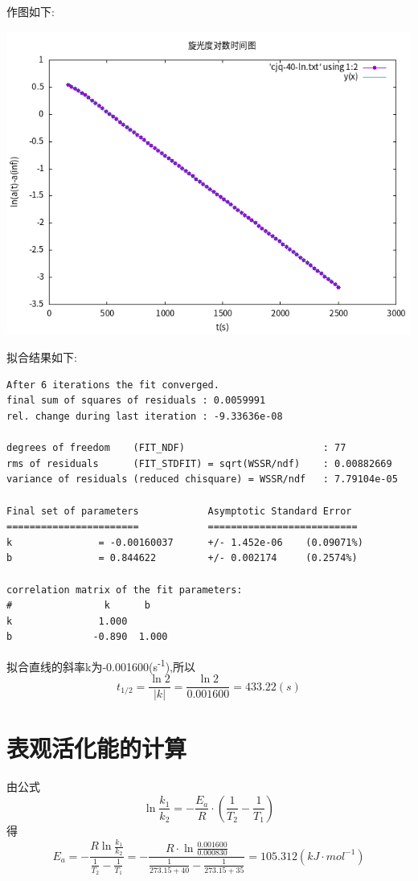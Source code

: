 \documentclass[11pt]{report}
\begin{document}
\begin{enumerate}
作图如下:
\begin{center}
\includegraphics[width=.9\linewidth]{../data/cjq-40-ln.png}
\end{center}
拟合结果如下:
\begin{verbatim}
After 6 iterations the fit converged.
final sum of squares of residuals : 0.0059991
rel. change during last iteration : -9.33636e-08

degrees of freedom    (FIT_NDF)                        : 77
rms of residuals      (FIT_STDFIT) = sqrt(WSSR/ndf)    : 0.00882669
variance of residuals (reduced chisquare) = WSSR/ndf   : 7.79104e-05

Final set of parameters            Asymptotic Standard Error
=======================            ==========================
k               = -0.00160037      +/- 1.452e-06    (0.09071%)
b               = 0.844622         +/- 0.002174     (0.2574%)

correlation matrix of the fit parameters:
#                k      b      
k               1.000 
b              -0.890  1.000 

\end{verbatim}
拟合直线的斜率k为-0.001600(s\textsuperscript{-1}),所以
\[
t_{1/2}=\frac{\ln 2}{|k|}=\frac{\ln 2}{0.001600}=433.22(s)
\]
\end{enumerate}

\section{表观活化能的计算}
\label{sec:orga4a1a8c}
由公式
\[
\ln\frac{k_{1}}{k_{2}}=-\frac{E_{a}}{R}\cdot \left(\frac{1}{T_{2}}-\frac{1}{T_{1}}\right)
\]
得
\[
E_{a}=-\frac{R\ln \frac{k_{1}}{k_{2}}}{\frac{1}{T_{2}}-\frac{1}{T_{1}}}=-\frac{R\cdot \ln\frac{0.001600}{0.000830}}{\frac{1}{273.15+40}-\frac{1}{273.15+35}}=105.312(kJ\cdot mol^{-1})
\]
\end{document}

